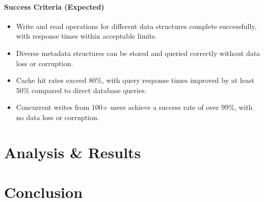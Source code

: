 \documentclass{article}
\begin{document}
\paragraph{Success Criteria (Expected)}
\begin{itemize}
    \item Write and read operations for different data structures complete successfully, with response times within acceptable limits.
    \item Diverse metadata structures can be stored and queried correctly without data loss or corruption.
    \item Cache hit rates exceed 80\%, with query response times improved by at least 50\% compared to direct database queries.
    \item Concurrent writes from 100+ users achieve a success rate of over 99\%, with no data loss or corruption.
\end{itemize}

\section{Analysis \& Results}

\paragraph{} 

\section{Conclusion}
\end{document}
